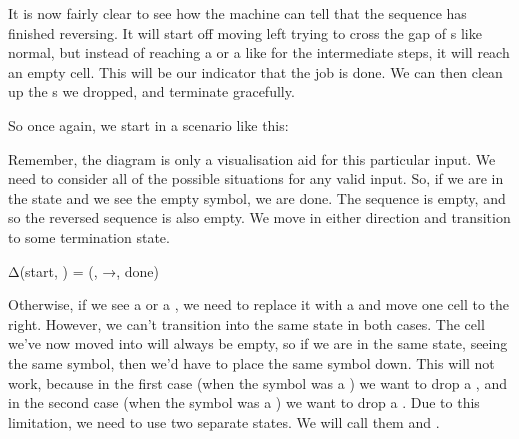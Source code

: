 It is now fairly clear to see how the machine can tell that the sequence has finished reversing. It will start off moving left trying to cross the gap of s like normal, but instead of reaching a  or a  like for the intermediate steps, it will reach an empty cell. This will be our indicator that the job is done. We can then clean up the s we dropped, and terminate gracefully.

So once again, we start in a scenario like this:

\begin{center}
\end{center}

Remember, the diagram is only a visualisation aid for this particular input. We need to consider all of the possible situations for any valid input. So, if we are in the  state and we see the empty symbol, we are done. The sequence is empty, and so the reversed sequence is also empty. We move in either direction and transition to some termination state.

\begin{stdout}
Δ(start, ) = (, →, done)
\end{stdout}
Otherwise, if we see a  or a , we need to replace it with a  and move one cell to the right. However, we can't transition into the same state in both cases. The cell we've now moved into will always be empty, so if we are in the same state, seeing the same symbol, then we'd have to place the same symbol down. This will not work, because in the first case (when the symbol was a ) we want to drop a , and in the second case (when the symbol was a ) we want to drop a . Due to this limitation, we need to use two separate states. We will call them  and .

